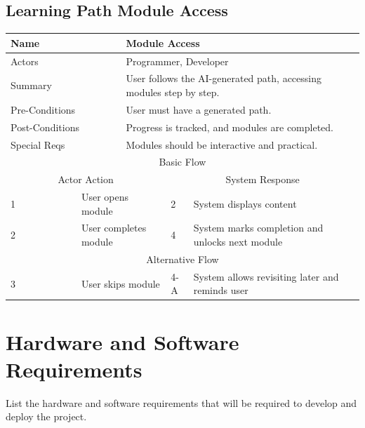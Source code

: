 \documentclass{FastFyp}
\begin{document}
\subsection{Learning Path Module Access}
\noindent
\begin{minipage}{\textwidth}
\centering
{}
\label{tab:moduleaccess}
\begin{tabular}{|p{}|p{}|p{}|p{}|p{}|}
\hline
\multicolumn{2}{|p{0.15\textwidth}|}{Name} &
  \multicolumn{3}{p{0.75\textwidth}|}{Module Access} \\ \hline
\multicolumn{2}{|p{0.15\textwidth}|}{Actors} &
  \multicolumn{3}{p{0.75\textwidth}|}{Programmer, Developer} \\ \hline
\multicolumn{2}{|p{0.15\textwidth}|}{Summary} &
  \multicolumn{3}{p{0.75\textwidth}|}{User follows the AI-generated path, accessing modules step by step.} \\ \hline
\multicolumn{2}{|p{0.15\textwidth}|}{Pre-Conditions} &
  \multicolumn{3}{p{0.75\textwidth}|}{User must have a generated path.} \\ \hline
\multicolumn{2}{|p{0.15\textwidth}|}{Post-Conditions} &
  \multicolumn{3}{p{0.75\textwidth}|}{Progress is tracked, and modules are completed.} \\ \hline
\multicolumn{2}{|p{0.15\textwidth}|}{Special Reqs} &
  \multicolumn{3}{p{0.75\textwidth}|}{Modules should be interactive and practical.} \\ \hline
\multicolumn{5}{|c|}{Basic Flow} \\ \hline
\multicolumn{3}{|c|}{Actor Action} &
  \multicolumn{2}{c|}{System Response} \\ \hline
1 &
  \multicolumn{2}{p{0.42\textwidth}|}{User opens module} &
  2 &
  System displays content \\ \hline
2 &
  \multicolumn{2}{p{0.42\textwidth}|}{User completes module} &
  4 &
  System marks completion and unlocks next module \\ \hline
\multicolumn{5}{|c|}{Alternative Flow} \\ \hline
3 &
  \multicolumn{2}{p{0.42\textwidth}|}{User skips module} &
  4-A &
  System allows revisiting later and reminds user \\ \hline
\end{tabular}
\end{minipage}

\section{Hardware and Software Requirements}
List the hardware and software requirements that will be required to develop and deploy the project.
\end{document}
